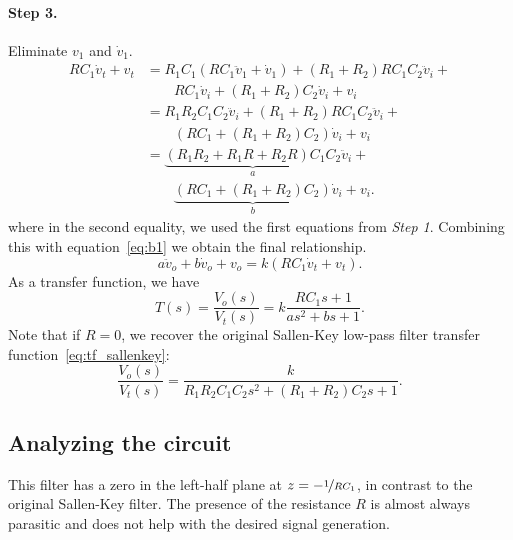 \paragraph{Step 3.} Eliminate $v_1$ and $\dot{v}_1$.
%
\begin{align*}
    RC_1\dot{v}_t + v_t &= R_1C_1\left(RC_1\ddot{v}_1 + \dot{v}_1 \right) + (R_1
    + R_2)RC_1C_2\ddot{v}_i + \\ 
    &\hspace{2em}RC_1\dot{v}_i + (R_1+R_2)C_2\dot{v}_i + v_i \\
    &= R_1R_2C_1C_2\ddot{v}_i + (R_1+R_2)RC_1C_2\ddot{v}_i + \\
    &\hspace{2em}\left(RC_1 + (R_1+R_2)C_2\right)\dot{v}_i + v_i \\
    &= \underbrace{\left(R_1R_2 + R_1R + R_2R\right)C_1C_2}_{a}\ddot{v}_i + \\
    &\hspace{2em}\underbrace{\left(RC_1 + (R_1+R_2)C_2\right)}_{b}\dot{v}_i + v_i.
\end{align*}
%
where in the second equality, we used the first equations from \textit{Step 1}.
Combining this with equation~\eqref{eq:b1} we obtain the final relationship.
%
\begin{equation}
a\ddot{v}_o + b\dot{v}_o + v_o = k(RC_1\dot{v}_t + v_t).
\label{eq:alt_de}
\end{equation}
%
As a transfer function, we have 
%
\begin{equation}
T(s) = \frac{V_o(s)}{V_t(s)} = k\frac{RC_1s + 1}{as^2 + bs + 1}.
\label{eq:alt_tf}
\end{equation}
%
Note that if $R = 0$, we recover the original Sallen-Key low-pass filter
transfer function~\eqref{eq:tf_sallenkey}:
%
\[\frac{V_o(s)}{V_t(s)} = \frac{k}{R_1R_2C_1C_2s^2 + (R_1+R_2)C_2s + 1}. \]

\vspace{-1em}
\subsection{Analyzing the circuit}
\vspace{-1em}

This filter has a zero in the left-half plane at $z = -\nicefrac{1}{RC_1}$,
in contrast to the original Sallen-Key filter. The presence of the resistance
$R$ is almost always parasitic and does not help with the desired signal
generation.
